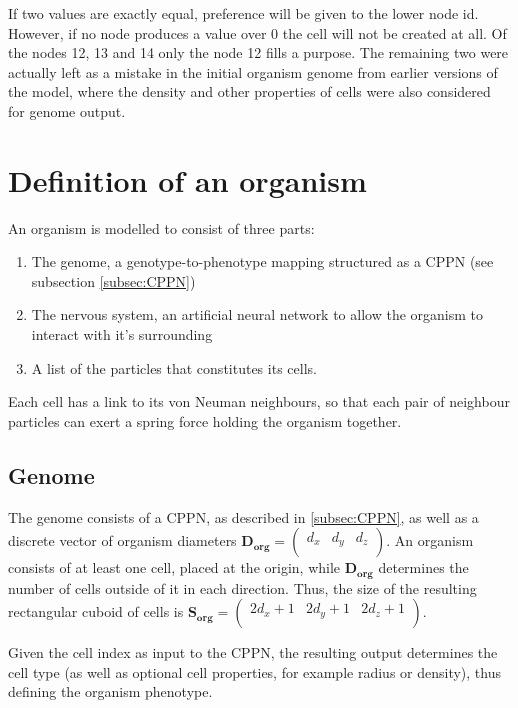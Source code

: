 If two values are exactly equal, preference will be given to the lower node id. However, if no node produces a value over 0 the cell will not be created at all. Of the nodes 12, 13 and 14 only the node 12 fills a purpose. The remaining two were actually left as a mistake in the initial organism genome from earlier versions of the model, where the density and other properties of cells were also considered for genome output.

\section{Definition of an organism}
An organism is modelled to consist of three parts:
\begin{enumerate}
    \item The genome, a genotype-to-phenotype mapping structured as a CPPN (see subsection \ref{subsec:CPPN})
    \item The nervous system, an artificial neural network to allow the organism to interact with it's surrounding
    \item A list of the particles that constitutes its cells.
\end{enumerate}
Each cell has a link to its von Neuman neighbours, so that each pair of neighbour particles can exert a spring force holding the organism together.


\subsection{Genome}
The genome consists of a CPPN, as described in \ref{subsec:CPPN}, as well as a discrete vector of organism diameters \(\mathbf{D_{org}}=\left(\begin{array}{ccc} d_x & d_y & d_z \\\end{array}\right)\). An organism consists of at least one cell, placed at the origin, while \(\mathbf{D_{org}}\) determines the number of cells outside of it in each direction. Thus, the size of the resulting rectangular cuboid of cells is
\(\mathbf{S_{org}}=\left(\begin{array}{ccc} 2 d_x + 1 & 2 d_y + 1 & 2 d_z + 1 \\\end{array}\right)\).

Given the cell index as input to the CPPN, the resulting output determines the cell type (as well as optional cell properties, for example radius or density), thus defining the organism phenotype.

